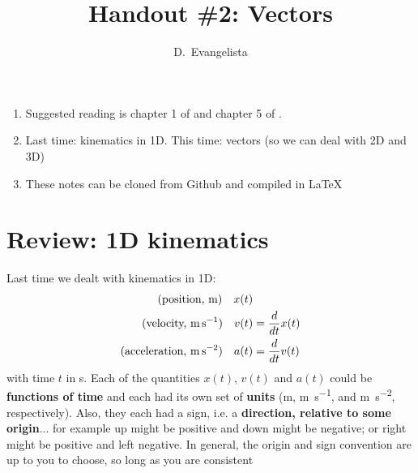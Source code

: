 \documentclass{tufte-handout}
\title{Handout \#2: Vectors}
\author{D.~Evangelista}
\date{\printdate{6/21/2021}}
\begin{document}
\maketitle
\begin{enumerate}
\item Suggested reading is chapter 1 of \citeauthor{kleppner2014introduction}\cite{kleppner2014introduction} and chapter 5 of \citeauthor{greenspan1987calculus}\cite{greenspan1987calculus}. 
\item Last time: kinematics in 1D. This time: vectors (so we can deal with 2D and 3D)
\item These notes can be cloned from Github and compiled in \LaTeX{}
\end{enumerate}

\section{Review: 1D kinematics} 
Last time we dealt with kinematics in 1D:
\begin{align}
\text{(position, \si{\meter})}\quad x(t) & \\
\text{(velocity, \si{\meter\per\second})}\quad v(t) &= \frac{d}{dt} x(t) \\
\text{(acceleration, \si{\meter\per\second\squared})}\quad a(t) &= \frac{d}{dt} v(t)
\end{align}
with time $t$ in \si{\second}. Each of the quantities $x(t)$, $v(t)$ and $a(t)$ could be \textbf{functions of time} and each had its own set of \textbf{units} (\si{\meter}, \si{\meter\per\second}, and \si{\meter\per\second\squared}, respectively). Also, they each had a sign, i.e. a \textbf{direction, relative to some origin}... for example up might be positive and down might be negative; or right might be positive and left negative. In general, the origin and sign convention are up to you to choose, so long as you are consistent 
\end{document}
